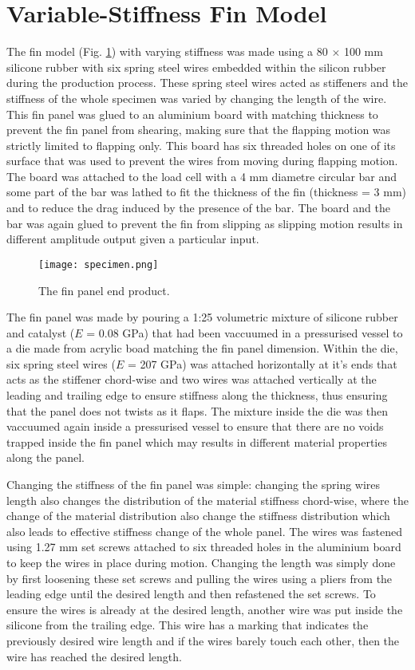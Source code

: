 \section{Variable-Stiffness Fin Model}
\label{sec:specimenmodel}
The fin model (Fig. \ref{fig:finpanel}) with varying stiffness was made using a 80 $\times$ 100 mm silicone rubber with six spring steel wires embedded within the silicon rubber during the production process. These spring steel wires acted as stiffeners and the stiffness of the whole specimen was varied by changing the length of the wire. This fin panel was glued to an aluminium board with matching thickness to prevent the fin panel from shearing, making sure that the flapping motion was strictly limited to flapping only. This board has six threaded holes on one of its surface that was used to prevent the wires from moving during flapping motion. The board was attached to the load cell with a 4 mm diametre circular bar and some part of the bar was lathed to fit the thickness of the fin (thickness = 3 mm) and to reduce the drag induced by the presence of the bar. The board and the bar was again glued to prevent the fin from slipping as slipping motion results in different amplitude output given a particular input.
\begin{figure}[H]
    \centering
    \texttt{[image: specimen.png]}
    \caption{The fin panel end product.}
    \label{fig:finpanel}
\end{figure}

The fin panel was made by pouring a 1:25 volumetric mixture of silicone rubber and catalyst ($E$ = 0.08 GPa) that had been vaccuumed in a pressurised vessel to a die made from acrylic boad matching the fin panel dimension. Within the die, six spring steel wires ($E$ = 207 GPa) was attached horizontally at it's ends that acts as the stiffener chord-wise and two wires was attached vertically at the leading and trailing edge to ensure stiffness along the thickness, thus ensuring that the panel does not twists as it flaps. The mixture inside the die was then vaccuumed again inside a pressurised vessel to ensure that there are no voids trapped inside the fin panel which may results in different material properties along the panel.\par
Changing the stiffness of the fin panel was simple: changing the spring wires length also changes the distribution of the material stiffness chord-wise, where the change of the material distribution also change the stiffness distribution which also leads to effective stiffness change of the whole panel. The wires was fastened using 1.27 mm set screws attached to six threaded holes in the aluminium board to keep the wires in place during motion. Changing the length was simply done by first loosening these set screws and pulling the wires using a pliers from the leading edge until the desired length and then refastened the set screws. To ensure the wires is already at the desired length, another wire was put inside the silicone from the trailing edge. This wire has a marking that indicates the previously desired wire length and if the wires barely touch each other, then the wire has reached the desired length.